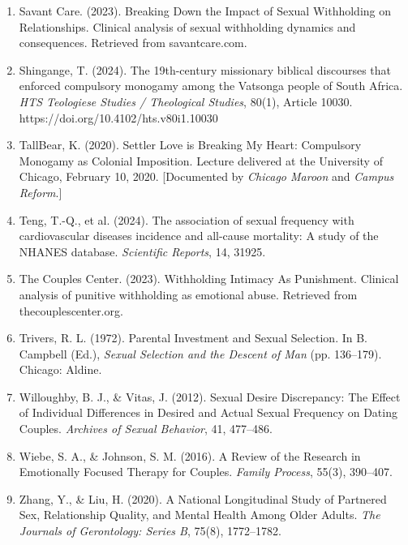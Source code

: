 \documentclass[12pt,openany]{book}
\numberwithin{equation}{chapter}
\begin{document}
\begin{enumerate}
    \item Savant Care. (2023). Breaking Down the Impact of Sexual Withholding on Relationships. Clinical analysis of sexual withholding dynamics and consequences. Retrieved from savantcare.com.
    
    \item Shingange, T. (2024). The 19th-century missionary biblical discourses that enforced compulsory monogamy among the Vatsonga people of South Africa. \textit{HTS Teologiese Studies / Theological Studies}, 80(1), Article 10030. https://doi.org/10.4102/hts.v80i1.10030
    
    \item TallBear, K. (2020). Settler Love is Breaking My Heart: Compulsory Monogamy as Colonial Imposition. Lecture delivered at the University of Chicago, February 10, 2020. [Documented by \textit{Chicago Maroon} and \textit{Campus Reform}.]
    
    \item Teng, T.-Q., et al. (2024). The association of sexual frequency with cardiovascular diseases incidence and all-cause mortality: A study of the NHANES database. \textit{Scientific Reports}, 14, 31925.
    
    \item The Couples Center. (2023). Withholding Intimacy As Punishment. Clinical analysis of punitive withholding as emotional abuse. Retrieved from thecouplescenter.org.
    
    \item Trivers, R. L. (1972). Parental Investment and Sexual Selection. In B. Campbell (Ed.), \textit{Sexual Selection and the Descent of Man} (pp. 136--179). Chicago: Aldine.
    
    \item Willoughby, B. J., \& Vitas, J. (2012). Sexual Desire Discrepancy: The Effect of Individual Differences in Desired and Actual Sexual Frequency on Dating Couples. \textit{Archives of Sexual Behavior}, 41, 477--486.
    
    \item Wiebe, S. A., \& Johnson, S. M. (2016). A Review of the Research in Emotionally Focused Therapy for Couples. \textit{Family Process}, 55(3), 390--407.
    
    \item Zhang, Y., \& Liu, H. (2020). A National Longitudinal Study of Partnered Sex, Relationship Quality, and Mental Health Among Older Adults. \textit{The Journals of Gerontology: Series B}, 75(8), 1772--1782.
\end{enumerate}
\end{document}
